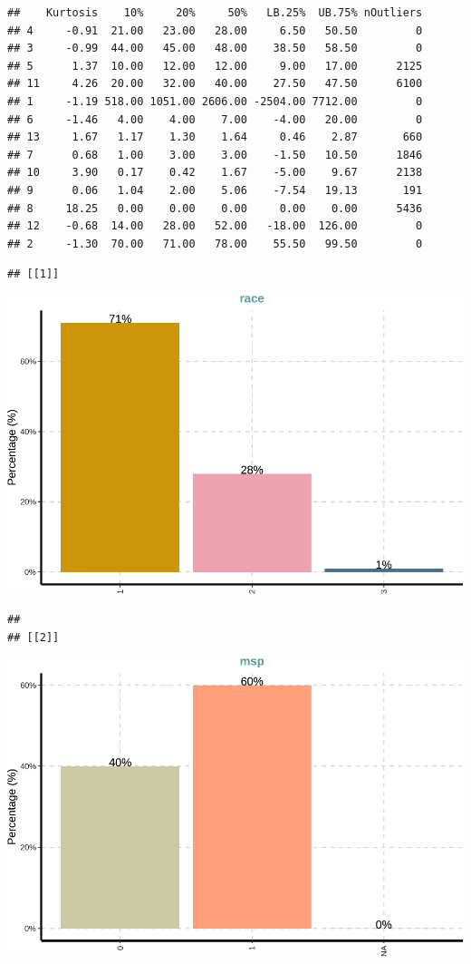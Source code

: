 \documentclass[
]{article}
\begin{document}
\begin{verbatim}
##    Kurtosis    10%     20%     50%   LB.25%  UB.75% nOutliers
## 4     -0.91  21.00   23.00   28.00     6.50   50.50         0
## 3     -0.99  44.00   45.00   48.00    38.50   58.50         0
## 5      1.37  10.00   12.00   12.00     9.00   17.00      2125
## 11     4.26  20.00   32.00   40.00    27.50   47.50      6100
## 1     -1.19 518.00 1051.00 2606.00 -2504.00 7712.00         0
## 6     -1.46   4.00    4.00    7.00    -4.00   20.00         0
## 13     1.67   1.17    1.30    1.64     0.46    2.87       660
## 7      0.68   1.00    3.00    3.00    -1.50   10.50      1846
## 10     3.90   0.17    0.42    1.67    -5.00    9.67      2138
## 9      0.06   1.04    2.00    5.06    -7.54   19.13       191
## 8     18.25   0.00    0.00    0.00     0.00    0.00      5436
## 12    -0.68  14.00   28.00   52.00   -18.00  126.00         0
## 2     -1.30  70.00   71.00   78.00    55.50   99.50         0
\end{verbatim}

\begin{verbatim}
## [[1]]
\end{verbatim}

\includegraphics{notebook_panel_data_files/figure-latex/Exploratory data analysis-1.pdf}

\begin{verbatim}
## 
## [[2]]
\end{verbatim}

\includegraphics{notebook_panel_data_files/figure-latex/Exploratory data analysis-2.pdf}
\end{document}
